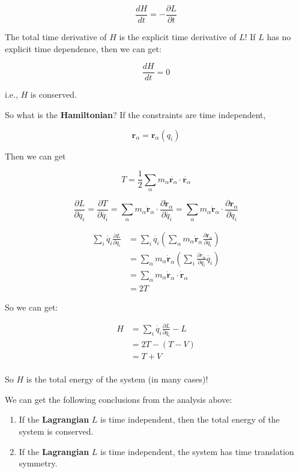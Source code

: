 \[
    \frac{dH}{dt}=-\frac{\partial L}{\partial t}
\]

The total time derivative of $H$ is the explicit time derivative of $L$! If $L$ has no explicit time dependence, then we can get:

\[
    \frac{dH}{dt}=0
\]

i.e., $H$ is conserved.

So what is the \textbf{Hamiltonian}? If the constraints are time independent,

\[
    \mathbf{r}_\alpha=\mathbf{r}_\alpha (q_i)
\]

Then we can get

\[
    T=\frac{1}{2} \sum_\alpha m_\alpha \dot{\mathbf{r}_\alpha} \cdot \dot{\mathbf{r}_\alpha}
\]

\[
    \frac{\partial L}{\partial \dot{q_i}} = \frac{\partial T}{\partial \dot{q_i}} = \sum_\alpha m_\alpha \dot{\mathbf{r}}_\alpha \cdot \frac{\partial \dot{\mathbf{r}}_\alpha}{\partial \dot{q_i}} = \sum_\alpha m_\alpha \dot{\mathbf{r}}_\alpha \cdot \frac{\partial \mathbf{r}_\alpha}{\partial q_i}
\]

\begin{align*}
    \sum_i \dot{q_i} \frac{\partial L}{\partial q_i} &= \sum_i \dot{q_i} \left(\sum_\alpha m_\alpha \dot{\mathbf{r}}_\alpha  \frac{\partial \mathbf{r}_\alpha}{\partial q_i}\right) \\
    &= \sum_\alpha m_\alpha \dot{\mathbf{r}}_\alpha \left(\sum_i \frac{\partial r_\alpha}{\partial q_i} \dot{q_i}\right) \\
    &= \sum_\alpha m_\alpha \dot{\mathbf{r}}_\alpha \cdot \dot{\mathbf{r}}_\alpha \\
    &= 2T
\end{align*}

So we can get:

\begin{align*}
    H &= \sum_i \dot{q_i} \frac{\partial L}{\partial q_i} - L \\
    &= 2T - \left(T - V\right) \\
    &= T + V \\
\end{align*}

So $H$ is the total energy of the system (in many cases)!

We can get the following conclusions from the analysis above:

\begin{enumerate}
    \item If the \textbf{Lagrangian} $L$ is time independent, then the total energy of the system is conserved.
    \item If the \textbf{Lagrangian} $L$ is time independent, the system has time translation symmetry.
\end{enumerate}

